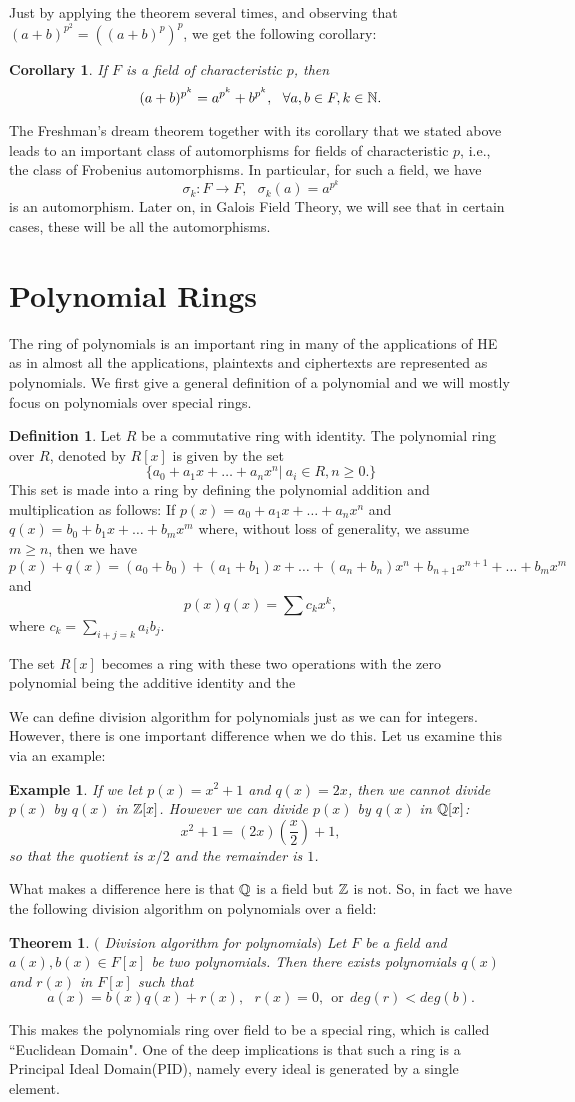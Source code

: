 \documentclass[12pt]{article}
\theoremstyle{plain}
\newtheorem{corollary}{Corollary}
\newtheorem{example}{Example}
\newtheorem{theorem}{Theorem}
\theoremstyle{definition}
\newtheorem{definition}{Definition}
\theoremstyle{remark}
\begin{document}
Just by applying the theorem several times, and observing that $(a+b)^{p^2} = ((a+b)^p)^p$, we get the following corollary:
\begin{corollary}
If $F$ is a field of characteristic $p$, then
$$(a+b)^{p^k}= a^{p^k}+b^{p^k},  \:\:\:\forall a,b \in F, k\in \mathbb{N}.$$
\end{corollary}
The Freshman's dream theorem together with its corollary that we stated above leads to an important class of automorphisms for fields of characteristic $p$, i.e., the class of Frobenius automorphisms. In particular, for such a field, we have
$$\sigma_k:F\rightarrow F, \:\:\:\sigma_k(a)=a^{p^k}$$ is an automorphism. Later on, in Galois Field Theory, we will see that in certain cases, these will be all the automorphisms.
\section{Polynomial Rings}
The ring of polynomials is an important ring in many of the applications of HE as in almost all the applications, plaintexts and ciphertexts are represented as polynomials. We first give a general definition of a polynomial and we will mostly focus on polynomials over special rings.
\begin{definition}
Let $R$ be a commutative ring with identity. The polynomial ring over $R$, denoted by $R[x]$ is given by the set
$$\{a_0+a_1x+\dots +a_nx^n| \: a_i\in R, n\geq 0.\}$$
This set is made into a ring by defining the polynomial addition and multiplication as follows:
If $p(x)=a_0+a_1x+\dots +a_nx^n$ and $q(x)=b_0+b_1x+\dots+b_mx^m$ where, without loss of generality, we assume $m\geq n$, then we have
$$p(x)+q(x) = (a_0+b_0)+(a_1+b_1)x+\dots +(a_n+b_n)x^n+b_{n+1}x^{n+1}+\dots +b_mx^m$$ and
$$p(x)q(x) = \sum c_kx^k,$$
where $c_k = \sum_{i+j=k}a_ib_j$.
\end{definition}
The set $R[x]$ becomes a ring with these two operations with the zero polynomial being the additive identity and the

We can define division algorithm for polynomials just as we can for integers. However, there is one important difference when we do this. Let us examine this via an example:
\begin{example}
If we let $p(x)=x^2+1$ and $q(x)=2x$, then we cannot divide $p(x)$ by $q(x)$ in $\mathbb{Z}[x]$. However we can divide $p(x)$ by $q(x)$ in $\mathbb{Q}[x]$:
$$x^2+1 = (2x)(\frac{x}{2})+1,$$ so that the quotient is $x/2$ and the remainder is $1$.
\end{example}
What makes a difference here is that $\mathbb{Q}$ is a field but $\mathbb{Z}$ is not. So, in fact we have the following division algorithm on polynomials over a field:
\begin{theorem}$($ Division algorithm for polynomials$)$
Let $F$ be a field and $a(x), b(x) \in F[x]$ be two polynomials. Then there exists polynomials $q(x)$ and $r(x)$ in $F[x]$ such that
$$a(x) = b(x)q(x)+r(x), \:\:\: r(x)=0, \:\:\textrm{or}\:\: deg(r)<deg(b).$$
\end{theorem}
This makes the polynomials ring over field to be a special ring, which is called ``Euclidean Domain". One of the deep implications is that such a ring is a Principal Ideal Domain(PID), namely every ideal is generated by a single element.
\end{document}
